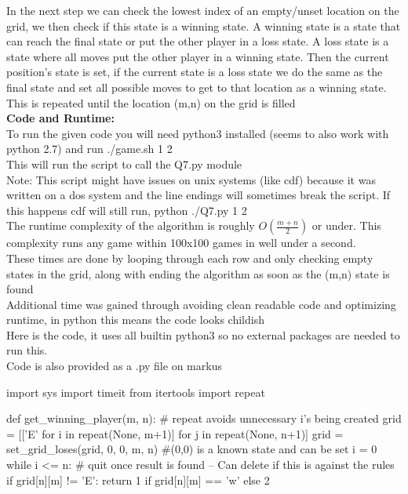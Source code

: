 \documentclass[a4paper,12pt]{article}
\begin{document}
\begin{enumerate}
		In the next step we can check the lowest index of an empty/unset location on the grid, we then check if this state is a winning state. A winning state is a state that can reach the final state or put the other player in a loss state. A loss state is a state where all moves put the other player in a winning state. Then the current position's state is set, if the current state is a loss state we do the same as the final state and set all possible moves to get to that location as a winning state.\\
		
		This is repeated until the location (m,n) on the grid is filled\\
		
		\textbf{Code and Runtime:}\\
		
		To run the given code you will need python3 installed (seems to also work with python 2.7) and run ./game.sh 1 2\\
		This will run the script to call the Q7.py module\\
		Note: This script might have issues on unix systems (like cdf) because it was written on a dos system and the line endings will sometimes break the script. If this happens cdf will still run, python ./Q7.py 1 2\\
		
		The runtime complexity of the algorithm is roughly $O(\frac{m+n}{2})$ or under. This complexity runs any game within 100x100 games in well under a second. \\
		
		These times are done by looping through each row and only checking empty states in the grid, along with ending the algorithm as soon as the (m,n) state is found \\
		
		Additional time was gained through avoiding clean readable code and optimizing runtime, in python this means the code looks childish\\
		
		
		Here is the code, it uses all builtin python3 so no external packages are needed to run this.\\
		Code is also provided as a .py file on markus\\
		
		\begin{python}
		import sys
		import timeit
		from itertools import repeat
		
		
		def get_winning_player(m, n):
			# repeat avoids unnecessary i's being created
			grid = [['E' for i in repeat(None, m+1)] for j in repeat(None, n+1)]
			grid = set_grid_loses(grid, 0, 0, m, n) #(0,0) is a known state and can be set
			i = 0
			while i <= n:
				# quit once result is found -- Can delete if this is against the rules
				if grid[n][m] != 'E':
					return 1 if grid[n][m] == 'w' else 2
			

\end{python}
\end{enumerate}
\end{document}

